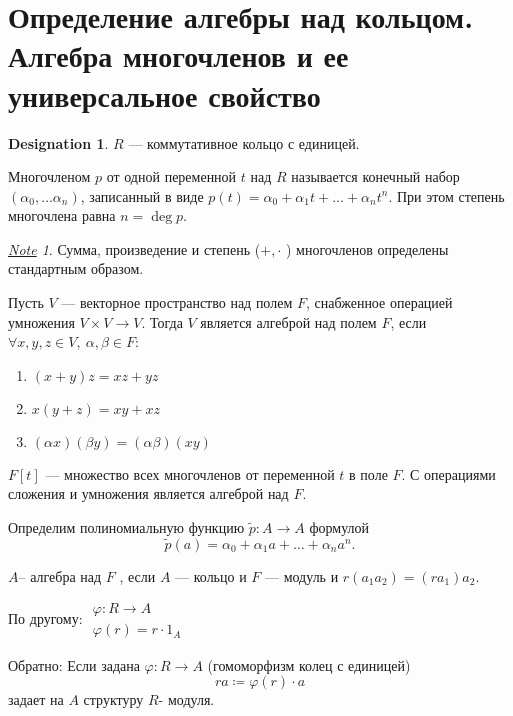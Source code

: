 \documentclass[11pt]{book}
\theoremstyle{definition}
\theoremstyle{plain}
\theoremstyle{plain}
\theoremstyle{definition}
\newtheorem*{name}{Designation}
\theoremstyle{remark}
\newtheorem*{note}{\underline{Note}}
\begin{document}
\section{Определение алгебры над кольцом. Алгебра многочленов и ее универсальное свойство}
\begin{name}
    $ R$ --- коммутативное кольцо с единицей.
\end{name}
\begin{defn}
    {\sf Многочленом  $ p$ от одной переменной $ t$ над $ R$} называется конечный набор $ ( \alpha _0, \ldots  \alpha _n)$, записанный в виде $p(t) =  \alpha _0 + \alpha _1 t + \ldots + \alpha _n t^{n}$. При этом {\sf степень многочлена} равна $ n = \deg p$.
\end{defn}
\begin{note}
    Сумма, произведение и степень ($ +, \cdot$ ) многочленов определены стандартным образом.
\end{note}
\begin{defn}
    Пусть $ V$ --- векторное пространство над полем  $ F$, снабженное операцией умножения  $ V \times V \to  V$. Тогда $ V$ является {\sf алгеброй над полем $ F$}, если  $ \forall x, y, z \in V, ~\alpha, \beta \in F$:
    \begin{enumerate}[noitemsep]
	\item $ (x+y) z = xz+ yz$
	\item  $ x (y + z) = xy + xz$
	\item  $ (\alpha x)(\beta y) = (\alpha \beta)(xy)$
    \end{enumerate}
\end{defn}
\begin{defn}
    $ F[t]$ --- {\sf множество всех многочленов} от переменной $ t$ в поле $ F$. С операциями сложения и умножения  является алгеброй над $ F$.
\end{defn}
Определим полиномиальную функцию $ \tilde p: A \to  A$ формулой
\[
    \tilde p(a) = \alpha_0 + \alpha_1 a + \ldots + \alpha_n a^{n}
.\]
\begin{defn}
    $ A $-- алгебра над $ F$ , если $ A$ --- кольцо и  $ F$  --- модуль и $ r(a_1 a_2) = (r a_1) a_2$.

    По другому:
    $
    \begin{array}{l}
	\varphi : R \to  A \\
	\varphi (r) = r \cdot 1_A
    \end{array}
    $

    Обратно:
    Если задана $ \varphi : R \to  A$ (гомоморфизм колец с единицей) \[
	ra \coloneqq \varphi (r) \cdot a
    \]
    задает на $ A$ структуру $ R$- модуля.
\end{defn}
\end{document}
